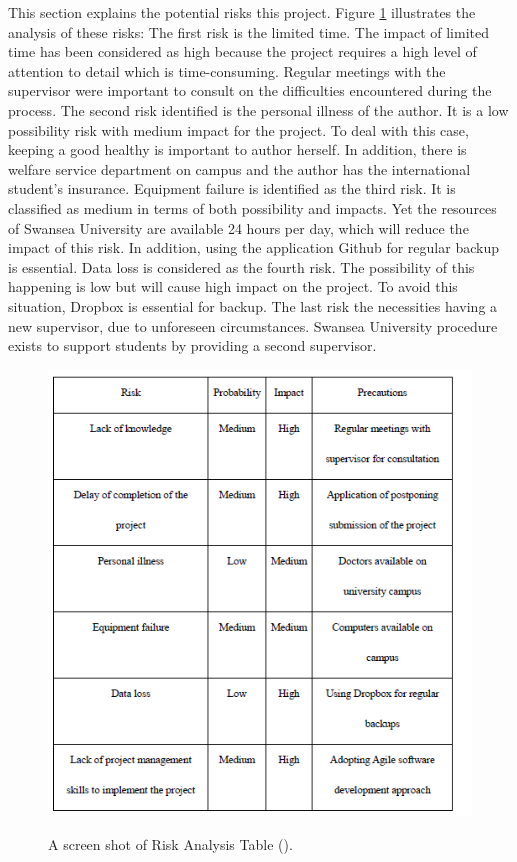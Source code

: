This section explains the potential risks this project.
Figure \ref{fig:riskAnalysis} illustrates the analysis of these risks: The first risk is the limited time. The impact of limited time has been considered as high because the project requires a high level of attention to detail which is time-consuming. Regular meetings with the supervisor were important to consult on the difficulties encountered during the process. The second risk identified is the personal illness of the author. It is a low possibility risk with medium impact for the project. To deal with this case, keeping a good healthy is important to author herself. In addition, there is welfare service department on campus and the author has the international student’s insurance. Equipment failure is identified as the third risk. It is classified as medium in terms of both possibility and impacts. Yet the resources of  Swansea University are available 24 hours per day, which will reduce the impact of this risk. In addition, using the application Github for regular backup is essential. Data loss is considered as the fourth risk. The possibility of this happening is low but will cause high impact on the project. To avoid this situation, Dropbox is essential for backup. The last risk the necessities having a new supervisor, due to unforeseen circumstances. Swansea University procedure exists to support students by providing a second supervisor. 

\begin{figure}[H]
	\centering    
	\includegraphics[scale=1]{Figs/Risk-Analysis}\\[1ex]
	\caption{A screen shot of Risk Analysis Table (\cite{Liu}). }
	\label{fig:riskAnalysis}
\end{figure}

